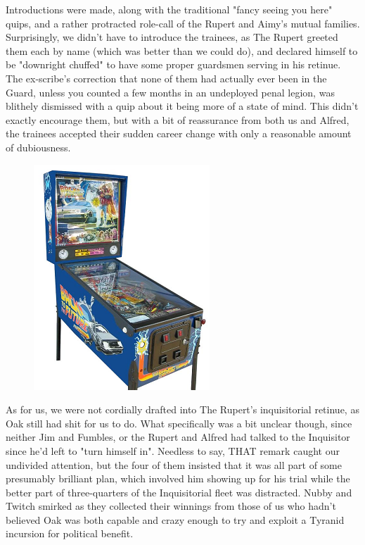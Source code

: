 Introductions were made, along with the traditional "fancy seeing you here" quips, and a rather protracted role-call of the Rupert and Aimy's mutual families. 
Surprisingly, we didn't have to introduce the trainees, as The Rupert greeted them each by name (which was better than we could do), and declared himself to be "downright chuffed" to have some proper guardsmen serving in his retinue. 
The ex-scribe's correction that none of them had actually ever been in the Guard, unless you counted a few months in an undeployed penal legion, was blithely dismissed with a quip about it being more of a state of mind. 
This didn't exactly encourage them, but with a bit of reassurance from both us and Alfred, the trainees accepted their sudden career change with only a reasonable amount of dubiousness.

\begin{figure}
	\begin{center}
		\includegraphics[width=\figwidth]{pics/21/125.png}
	\end{center}
\end{figure}
As for us, we were not cordially drafted into The Rupert's inquisitorial retinue, as Oak still had shit for us to do. 
What specifically was a bit unclear though, since neither Jim and Fumbles, or the Rupert and Alfred had talked to the Inquisitor since he'd left to "turn himself in". 
Needless to say, THAT remark caught our undivided attention, but the four of them insisted that it was all part of some presumably brilliant plan, which involved him showing up for his trial while the better part of three-quarters of the Inquisitorial fleet was distracted. 
Nubby and Twitch smirked as they collected their winnings from those of us who hadn't believed Oak was both capable and crazy enough to try and exploit a Tyranid incursion for political benefit.

